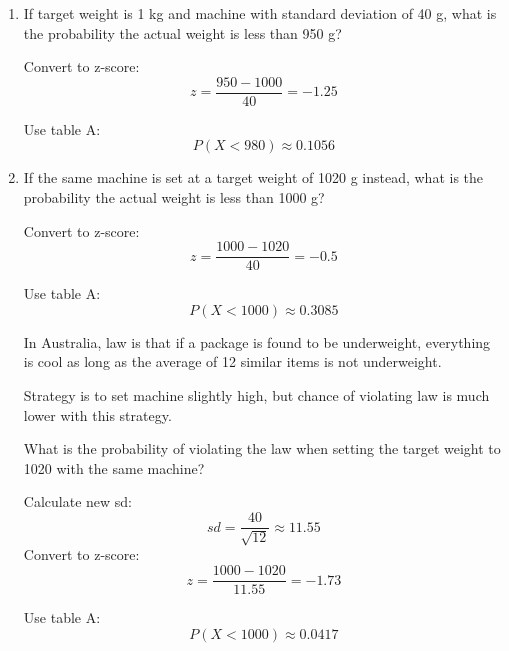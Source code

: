 \documentclass[letterpaper, landscape]{exam}
\begin{document}
  \begin{enumerate}
    \item If target weight is 1 kg and machine with standard deviation of 40 g,
      what is the probability the actual weight is less than 950 g?

    \begin{solution}
      Convert to z-score:
      \[
        z = \frac{950 - 1000}{40} = -1.25
      \]

      Use table A:\@
      \[
        P(X < 980) \approx 0.1056
      \]
    \end{solution}

    \item If the same machine is set at a target weight of 1020 g instead, what
      is the probability the actual weight is less than 1000 g?

    \begin{solution}
      Convert to z-score:
      \[
        z = \frac{1000 - 1020}{40} = -0.5
      \]

      Use table A:\@
      \[
        P(X < 1000) \approx 0.3085
      \]
    \end{solution}

    In Australia, law is that if a package is found to be underweight,
    everything is cool as long as the average of 12 similar items is not
    underweight.


    Strategy is to set machine slightly high, but chance of violating law is
    much lower with this strategy.

    What is the probability of violating the law when setting the target weight
    to 1020 with the same machine?

    \begin{solution}
      Calculate new sd:
      \[
        sd = \frac{40}{\sqrt{12}} \approx 11.55
      \]
      Convert to z-score:
      \[
        z = \frac{1000 - 1020}{11.55} = -1.73
      \]

      Use table A:\@
      \[
        P(X < 1000) \approx 0.0417
      \]
    \end{solution}

  \end{enumerate}
\end{document}
